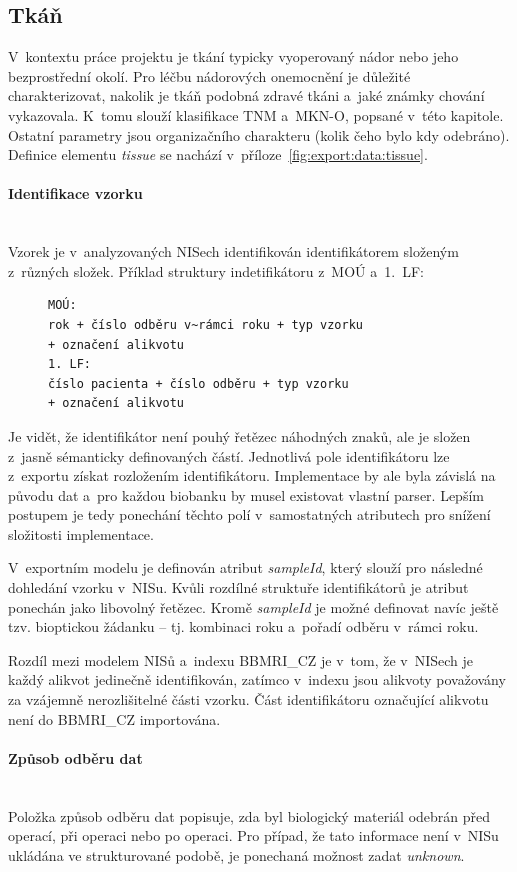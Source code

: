 \documentclass[11pt, final, oneside]{fithesis2}
\newcommand{\paragraphNewLine}[1]{\paragraph*{#1}\mbox{}\\}
\newcommand{\ProjectName}{\mbox{BBMRI\_CZ}\xspace}
\begin{document}

\subsection{Tkáň}
V~kontextu práce projektu je tkání typicky vyoperovaný nádor nebo jeho bezprostřední okolí. Pro léčbu nádorových onemocnění je důležité charakterizovat, nakolik je tkáň podobná zdravé tkáni a~jaké známky chování vykazovala. K~tomu slouží klasifikace TNM a~MKN-O, popsané v~této kapitole. Ostatní parametry jsou organizačního charakteru (kolik čeho bylo kdy odebráno).
Definice elementu \textit{tissue} se nachází v~příloze~\ref{fig:export:data:tissue}.

\paragraphNewLine{Identifikace vzorku}
Vzorek je v~analyzovaných NISech identifikován identifikátorem složeným z~různých složek.
Příklad struktury indetifikátoru z~MOÚ a~1.~LF:
\begin{figure}[h!]
\centering
\begin{BVerbatim}
MOÚ: 
rok + číslo odběru v~rámci roku + typ vzorku 
+ označení alikvotu
1. LF: 
číslo pacienta + číslo odběru + typ vzorku 
+ označení alikvotu
\end{BVerbatim}
\end{figure}

Je vidět, že identifikátor není pouhý řetězec náhodných znaků, ale je složen z~jasně sémanticky definovaných částí. Jednotlivá pole identifikátoru lze z~exportu získat rozložením identifikátoru. Implementace by ale byla závislá na původu dat a~pro každou biobanku by musel existovat vlastní parser. Lepším postupem je tedy ponechání těchto polí v~samostatných atributech pro snížení složitosti implementace. 

V~exportním modelu je definován atribut \textit{sampleId}, který slouží pro následné dohledání vzorku v~NISu. Kvůli rozdílné struktuře identifikátorů je atribut ponechán jako libovolný řetězec. Kromě \textit{sampleId} je možné definovat navíc ještě tzv. bioptickou žádanku -- tj. kombinaci roku a~pořadí odběru v~rámci roku.

Rozdíl mezi modelem NISů a~indexu \ProjectName je v~tom, že v~NISech je každý alikvot jedinečně identifikován, zatímco v~indexu jsou alikvoty považovány za vzájemně nerozlišitelné části vzorku. Část identifikátoru označující alikvotu není do \ProjectName importována.	
					
 \paragraphNewLine{Způsob odběru dat}					
	Položka způsob odběru dat popisuje, zda byl biologický materiál odebrán před operací, při operaci nebo po operaci. Pro případ, že tato informace není v~NISu ukládána ve strukturované podobě, je ponechaná možnost zadat \textit{unknown}.
\end{document}
